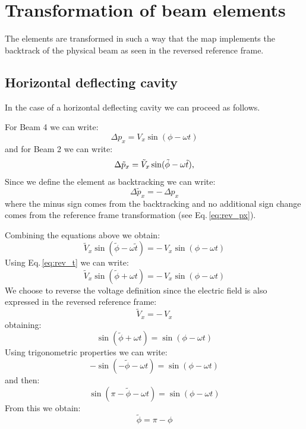 \section{Transformation of beam elements}

The elements are transformed in such a way that the map implements the backtrack of
the physical beam as seen in the reversed reference frame.

\subsection{Horizontal deflecting cavity}

In the case of a horizontal deflecting cavity we can proceed as follows.

For Beam 4 we can write:
\begin{equation}
\Delta p_x = V_x \sin(\phi - \omega t)
\end{equation}
and for Beam 2 we can write:
\begin{equation}
\Delta\tilde{p}_x = \tilde{V}_x \sin(\tilde{\phi} - \omega \tilde{t}),\\[4pt]
\end{equation}
Since we define the element as backtracking we can write:
\begin{equation}
\Delta \tilde{p}_x = -\,\Delta p_x
\end{equation}
where the minus sign comes from the backtracking and no additional sign change
comes from the reference frame transformation (see Eq.\,\ref{eq:rev_px}).

Combining the equations above we obtain:
\begin{equation}
\tilde{V}_x \sin(\tilde{\phi} - \omega \tilde{t}) = -\,V_x \sin(\phi - \omega t)
\end{equation}
Using Eq.\,\ref{eq:rev_t} we can write:
\begin{equation}
\tilde{V}_x \sin(\tilde{\phi} + \omega t) = -\,V_x \sin(\phi - \omega t)
\end{equation}
We choose to reverse the voltage definition since the electric field is also
expressed in the reversed reference frame:
\begin{equation}
\boxed{
\tilde{V}_x = -\,V_x
}
\end{equation}
obtaining:
\begin{equation}
\sin(\tilde{\phi} + \omega t) = \sin(\phi - \omega t)
\end{equation}
Using trigonometric properties we can write:
\begin{equation}
-\sin(-\tilde{\phi} - \omega t) = \sin(\phi - \omega t)
\end{equation}
and then:
\begin{equation}
\sin(\pi - \tilde{\phi} - \omega t) = \sin(\phi - \omega t)
\end{equation}
From this we obtain:
\begin{equation}
\boxed{
\tilde{\phi} = \pi - \phi
}
\end{equation}

